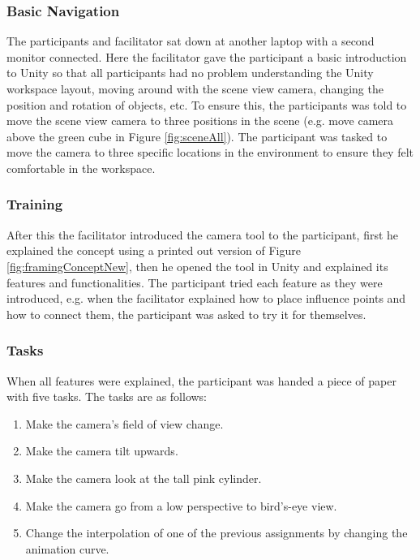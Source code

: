 \subsubsection{Basic Navigation}
The participants and facilitator sat down at another laptop with a second monitor connected. Here the facilitator gave the participant a basic introduction to Unity so that all participants had no problem understanding the Unity workspace layout, moving around with the scene view camera, changing the position and rotation of objects, etc. To ensure this, the participants was told to move the scene view camera to three positions in the scene (e.g. move camera above the green cube in Figure \ref{fig:sceneAll}). The participant was tasked to move the camera to three specific locations in the environment to ensure they felt comfortable in the workspace. 

\subsubsection{Training} 
After this the facilitator introduced the camera tool to the participant, first he explained the concept using a printed out version of Figure \ref{fig:framingConceptNew}, then he opened the tool in Unity and explained its features and functionalities. The participant tried each feature as they were introduced, e.g. when the facilitator explained how to place influence points and how to connect them, the participant was asked to try it for themselves. 

\subsubsection{Tasks}
When all features were explained, the participant was handed a piece of paper with five tasks. The tasks are as follows:

\begin{enumerate}
\item Make the camera's field of view change.
\item Make the camera tilt upwards.
\item Make the camera look at the tall pink cylinder.
\item Make the camera go from a low perspective to bird’s-eye view.
\item Change the interpolation of one of the previous assignments by changing the animation curve.
\end{enumerate} 

